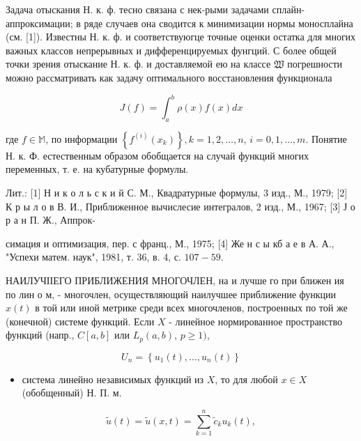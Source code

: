 \documentclass[10pt]{article}
\begin{document}
Задача отыскания Н. к. ф. тесно связана с нек-рыми задачами сплайн-аппроксимации; в ряде случаев она сводится к минимизации нормы моносплайна (см. [1]). Известны Н. к. ф. и соответствуюгце точные оценки остатка для многих важных классов непрерывных и дифференцируемых фунгций. С более общей точки зрения отыскание Н. к. ф. и доставляемой ею на классе $\mathfrak{W}$ погрешности можно рассматривать как задачу оптимального восстановления функционала



\[

J(f)=\int_{a}^{b} \rho(x) f(x) d x

\]



где $f \in \mathbb{M}$, по информации $\left\{f^{(i)}\left(x_{k}\right)\right\}, k=1,2, \ldots, n$, $i=0,1, \ldots, m$. Понятие Н. к. Ф. естественным образом обобщается на случай функций многих переменных, т. е. на кубатурные формулы.



Лит.: [1] Н и к о л ь с к и й С. М., Квадратурные формулы, 3 изд., М., 1979; [2] К р ы л о в В. И., Приближенное вычислесие интегралов, 2 изд., М., 1967; [3] Ј о р а н П. Ж., Аппрок-

симация и оптимизация, пер. с франц., М., 1975; [4] Же н с ы кб а е в А. А., "Успехи матем. наук", 1981, т. 36, в. 4, с. $107-59$.



НАИЛУЧІІЕГО ПРИБЛИЖЕНИЯ МНОГОЧЛЕН, на и лучше го при ближен ия по лин о м, - многочлен, осуществляющий наилучшее приближение функции $x(t)$ в той или иной метрике среди всех многочленов, построенных по той же (конечной) системе функций. Если $X$ - линейное нормированное пространство функций (напр., $C[a, b]$ или $L_{p}(a, b)$, $p \geqslant 1)$,



\[

U_{n}=\left\{u_{1}(t), \ldots, u_{n}(t)\right\}

\]



\begin{itemize}

  \item система линейно независимых функций из $X$, то для любой $x \in X$ (обобщенный) Н. П. м.

\end{itemize}



\[

\tilde{u}(t)=\tilde{u}(x, t)=\sum_{k=1}^{n} \tilde{c}_{k} u_{k}(t),

\]
\end{document}
